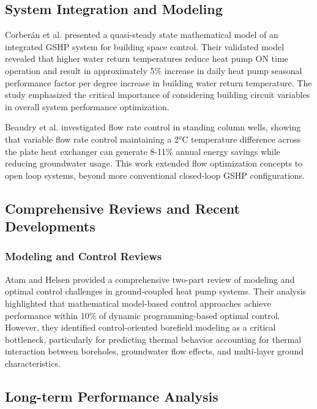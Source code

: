 \documentclass[journal=iecr,manuscript=]{achemso}
\begin{document}
\subsection{System Integration and
Modeling}\label{system-integration-and-modeling}

Corberán et al. \citep{corberan2010quasi} presented a quasi-steady state
mathematical model of an integrated GSHP system for building space
control. Their validated model revealed that higher water return
temperatures reduce heat pump ON time operation and result in
approximately 5\% increase in daily heat pump seasonal performance
factor per degree increase in building water return temperature. The
study emphasized the critical importance of considering building circuit
variables in overall system performance optimization.

Beaudry et al. \citep{beaudry2022flow} investigated flow rate control in
standing column wells, showing that variable flow rate control
maintaining a 2°C temperature difference across the plate heat exchanger
can generate 8-11\% annual energy savings while reducing groundwater
usage. This work extended flow optimization concepts to open loop
systems, beyond more conventional closed-loop GSHP configurations.

\subsection{Comprehensive Reviews and Recent
Developments}\label{comprehensive-reviews-and-recent-developments}

\subsubsection{Modeling and Control
Reviews}\label{modeling-and-control-reviews}

Atam and Helsen \citep{atam2015ground} provided a comprehensive two-part
review of modeling and optimal control challenges in ground-coupled heat
pump systems. Their analysis highlighted that mathematical model-based
control approaches achieve performance within 10\% of dynamic
programming-based optimal control. However, they identified
control-oriented borefield modeling as a critical bottleneck,
particularly for predicting thermal behavior accounting for thermal
interaction between boreholes, groundwater flow effects, and multi-layer
ground characteristics.

\subsection{Long-term Performance
Analysis}\label{long-term-performance-analysis}
\end{document}
